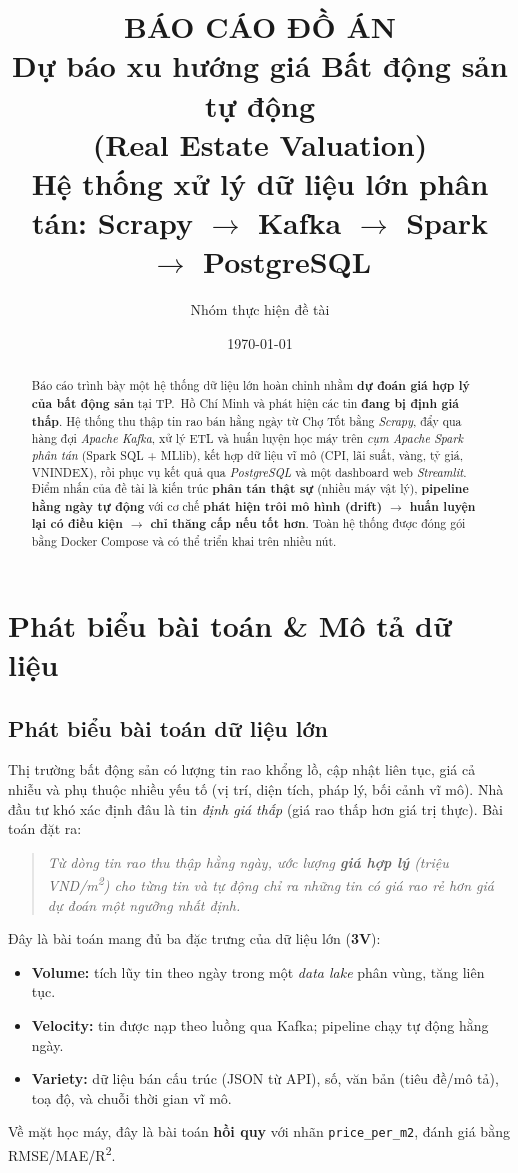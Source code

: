 \documentclass[12pt,a4paper]{article}
\title{\textbf{BÁO CÁO ĐỒ ÁN}\\[0.4cm]
\large Dự báo xu hướng giá Bất động sản tự động\\
(Real Estate Valuation)\\[0.3cm]
\normalsize Hệ thống xử lý dữ liệu lớn phân tán: Scrapy $\rightarrow$ Kafka $\rightarrow$ Spark $\rightarrow$ PostgreSQL}
\author{Nhóm thực hiện đề tài}
\date{\today}
\begin{document}
\maketitle

\begin{abstract}
\noindent Báo cáo trình bày một hệ thống dữ liệu lớn hoàn chỉnh nhằm \textbf{dự đoán giá hợp lý của bất động sản} tại TP.\ Hồ Chí Minh và phát hiện các tin \textbf{đang bị định giá thấp}. Hệ thống thu thập tin rao bán hằng ngày từ Chợ Tốt bằng \textit{Scrapy}, đẩy qua hàng đợi \textit{Apache Kafka}, xử lý ETL và huấn luyện học máy trên \textit{cụm Apache Spark phân tán} (Spark SQL + MLlib), kết hợp dữ liệu vĩ mô (CPI, lãi suất, vàng, tỷ giá, VNINDEX), rồi phục vụ kết quả qua \textit{PostgreSQL} và một dashboard web \textit{Streamlit}. Điểm nhấn của đề tài là kiến trúc \textbf{phân tán thật sự} (nhiều máy vật lý), \textbf{pipeline hằng ngày tự động} với cơ chế \textbf{phát hiện trôi mô hình (drift) $\rightarrow$ huấn luyện lại có điều kiện $\rightarrow$ chỉ thăng cấp nếu tốt hơn}. Toàn hệ thống được đóng gói bằng Docker Compose và có thể triển khai trên nhiều nút.
\end{abstract}

\tableofcontents
\newpage

\section{Phát biểu bài toán \& Mô tả dữ liệu}

\subsection{Phát biểu bài toán dữ liệu lớn}
Thị trường bất động sản có lượng tin rao khổng lồ, cập nhật liên tục, giá cả nhiễu và phụ thuộc nhiều yếu tố (vị trí, diện tích, pháp lý, bối cảnh vĩ mô). Nhà đầu tư khó xác định đâu là tin \textit{định giá thấp} (giá rao thấp hơn giá trị thực). Bài toán đặt ra:
\begin{quote}
\itshape Từ dòng tin rao thu thập hằng ngày, ước lượng \textbf{giá hợp lý} (triệu VND/m\textsuperscript{2}) cho từng tin và tự động chỉ ra những tin có giá rao rẻ hơn giá dự đoán một ngưỡng nhất định.
\end{quote}

Đây là bài toán mang đủ ba đặc trưng của dữ liệu lớn (\textbf{3V}):
\begin{itemize}[nosep]
  \item \textbf{Volume:} tích lũy tin theo ngày trong một \textit{data lake} phân vùng, tăng liên tục.
  \item \textbf{Velocity:} tin được nạp theo luồng qua Kafka; pipeline chạy tự động hằng ngày.
  \item \textbf{Variety:} dữ liệu bán cấu trúc (JSON từ API), số, văn bản (tiêu đề/mô tả), toạ độ, và chuỗi thời gian vĩ mô.
\end{itemize}
Về mặt học máy, đây là bài toán \textbf{hồi quy} với nhãn \texttt{price\_per\_m2}, đánh giá bằng RMSE/MAE/R\textsuperscript{2}.
\end{document}
